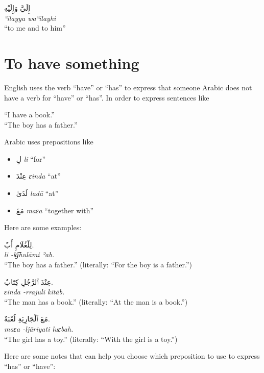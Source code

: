 \documentclass[
  10pt,
]{book}
\providecommand{\tightlist}{%
  \setlength{\itemsep}{0pt}\setlength{\parskip}{0pt}}
\begin{document}
\foreignlanguage{arabic}{إِلَيَّ وَإِلَيْهِ}\\
\emph{ʾilayya waʾilayhi}\\
\enquote{to me and to him}

\section{To have something}\label{to-have-something}

English uses the verb \enquote{have} or \enquote{has} to express that someone
Arabic does not have a verb for \enquote{have} or \enquote{has}. In order to express sentences like

\enquote{I have a book.}\\
\enquote{The boy has a father.}

Arabic uses prepositions like

\begin{itemize}
\tightlist
\item
  \foreignlanguage{arabic}{لِ} \emph{li} \enquote{for}
\item
  \foreignlanguage{arabic}{عِنْدَ} \emph{ɛinda} \enquote{at}
\item
  \foreignlanguage{arabic}{لَدَىٰ} \emph{ladā} \enquote{at}
\item
  \foreignlanguage{arabic}{مَعَ} \emph{maɛa} \enquote{together with}
\end{itemize}

Here are some examples:

\foreignlanguage{arabic}{لِلْغُلَامِ أَبٌ.}\\
\emph{li -lg͡hulāmi ʾab.}\\
\enquote{The boy has a father.} (literally: \enquote{For the boy is a father.})

\foreignlanguage{arabic}{عِنْدَ ٱلرَّجُلِ کِتَابٌ.}\\
\emph{ɛinda -rrajuli kitāb.}\\
\enquote{The man has a book.} (literally: \enquote{At the man is a book.})

\foreignlanguage{arabic}{مَعَ ٱلْجَارِيَةِ لُعْبَةٌ.}\\
\emph{maɛa -ljāriyati luɛbah.}\\
\enquote{The girl has a toy.} (literally: \enquote{With the girl is a toy.})

Here are some notes that can help you choose which preposition to use to express \enquote{has} or \enquote{have}:
\end{document}
